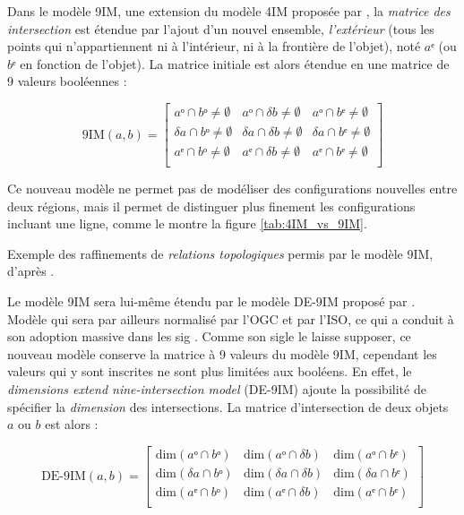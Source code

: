 Dans le modèle 9IM, une extension du modèle 4IM proposée par
\textcite{Egenhofer1991}, la \emph{matrice des intersection} est
étendue par l'ajout d'un nouvel ensemble, \emph{l'extérieur} (\ie tous
les points qui n'appartiennent ni à l'intérieur, ni à la frontière de
l'objet), noté \(aᵉ\) (ou \(bᵉ\) en fonction de l'objet). La matrice
initiale est alors étendue en une matrice de 9 valeurs booléennes :

\begin{equation}
  \label{eq:matrice_9IM}
  \text{9IM}(a,b) =
  \begin{bmatrix}
    aᵒ ∩ bᵒ ≠ ∅ & aᵒ ∩ δb ≠ ∅ & aᵒ ∩ bᵉ ≠ ∅ \\
    δa ∩ bᵒ ≠ ∅ & δa ∩ δb ≠ ∅ & δa ∩ bᵉ ≠ ∅ \\
    aᵉ ∩ bᵒ ≠ ∅ & aᵉ ∩ δb ≠ ∅ & aᵉ ∩ bᵉ ≠ ∅ \\
  \end{bmatrix}
\end{equation}

Ce nouveau modèle ne permet pas de modéliser des configurations
nouvelles entre deux régions, mais il permet de distinguer plus
finement les configurations incluant une ligne, comme le montre la
figure \ref{tab:4IM_vs_9IM}.

\begin{table}
  \centering
  \caption{Exemple des raffinements de \emph{relations topologiques}
    permis par le modèle 9IM, d'après \textcite{Egenhofer2011}.}
  \label{tab:4IM_vs_9IM}
\end{table}

Le modèle 9IM sera lui-même étendu par le modèle DE-9IM proposé par
\textcite{Clementini1993}. Modèle qui sera par ailleurs normalisé par
l'OGC et par l'ISO, ce qui a conduit à son adoption massive dans les
\ac{sig} \autocite{Strobl2008}. Comme son sigle le laisse supposer, ce
nouveau modèle conserve la matrice à 9 valeurs du modèle 9IM,
cependant les valeurs qui y sont inscrites ne sont plus limitées aux
booléens. En effet, le \emph{dimensions extend nine-intersection
  model} (DE-9IM) ajoute la possibilité de spécifier la
\emph{dimension} des intersections. La matrice d'intersection de deux
objets \(a\) ou \(b\) est alors :

\begin{equation}
  \label{eq:matrice_DE9IM}
  \text{DE-9IM}(a,b) =
  \begin{bmatrix}
    \text{dim}(aᵒ ∩ bᵒ)&\text{dim}(aᵒ ∩ δb)&\text{dim}(aᵒ ∩ bᵉ)\\
    \text{dim}(δa ∩ bᵒ)&\text{dim}(δa ∩ δb)&\text{dim}(δa ∩ bᵉ)\\
    \text{dim}(aᵉ ∩ bᵒ)&\text{dim}(aᵉ ∩ δb)&\text{dim}(aᵉ ∩ bᵉ)\\
  \end{bmatrix}
\end{equation}

